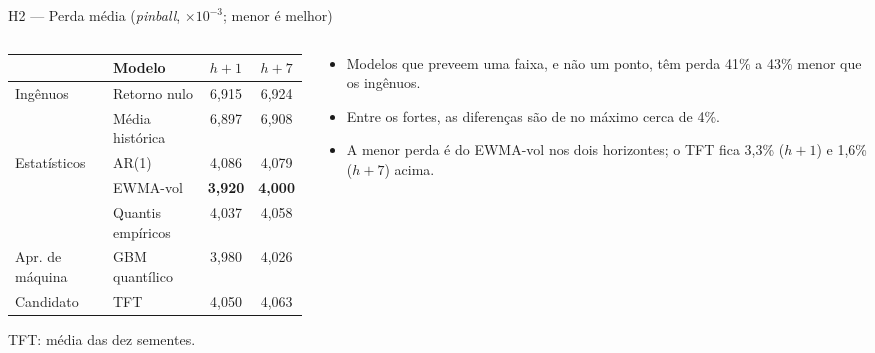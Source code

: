 \documentclass[aspectratio=169,10pt]{beamer}
\newcommand{\hum}{\(h{+}1\)}
\newcommand{\hsete}{\(h{+}7\)}
\begin{document}
\begin{frame}{H2 --- Perda média (\textit{pinball}, \(\times 10^{-3}\); menor é melhor)}
  \begin{columns}[T]
    \begin{column}{0.56\textwidth}
      \small
      \setlength{\tabcolsep}{4pt}
      \begin{tabular}{l l c c}
        \toprule
        & Modelo & \hum & \hsete \\
        \midrule
        Ingênuos & Retorno nulo & 6,915 & 6,924 \\
                 & Média histórica & 6,897 & 6,908 \\
        \midrule
        Estatísticos & AR(1) & 4,086 & 4,079 \\
                     & EWMA-vol & \alert{\textbf{3,920}} & \alert{\textbf{4,000}} \\
                     & Quantis empíricos & 4,037 & 4,058 \\
        \midrule
        Apr. de máquina & GBM quantílico & 3,980 & 4,026 \\
        \midrule
        Candidato & TFT & 4,050 & 4,063 \\
        \bottomrule
      \end{tabular}

      {\small TFT: média das dez sementes.}
    \end{column}
    \begin{column}{0.4\textwidth}
      \begin{itemize}
        \item Modelos que preveem uma faixa, e não um ponto, têm perda 41\% a 43\%
          menor que os ingênuos.
        \item Entre os fortes, as diferenças são de no máximo cerca de 4\%.
        \item A menor perda é do \alert{EWMA-vol} nos dois horizontes; o TFT fica
          3,3\% (\hum) e 1,6\% (\hsete) acima.
      \end{itemize}
    \end{column}
  \end{columns}
\end{frame}
\end{document}
